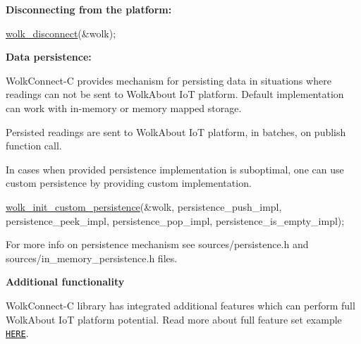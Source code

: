 {\bfseries Disconnecting from the platform\+:} 
\begin{DoxyCode}
\hyperlink{wolk__connector_8h_af174943365b8cddc1e6e9351996805c3}{wolk\_disconnect}(&wolk);
\end{DoxyCode}


{\bfseries Data persistence\+:}

Wolk\+Connect-\/C provides mechanism for persisting data in situations where readings can not be sent to Wolk\+About IoT platform. Default implementation can work with in-\/memory or memory mapped storage.

Persisted readings are sent to Wolk\+About IoT platform, in batches, on publish function call.

In cases when provided persistence implementation is suboptimal, one can use custom persistence by providing custom implementation.


\begin{DoxyCode}
\hyperlink{wolk__connector_8h_a4cb5cc0164b0ab19f9b2bf36d28e9913}{wolk\_init\_custom\_persistence}(&wolk,
                             persistence\_push\_impl,
                             persistence\_peek\_impl, persistence\_pop\_impl,
                             persistence\_is\_empty\_impl);
\end{DoxyCode}


For more info on persistence mechanism see {\ttfamily sources/persistence.\+h} and {\ttfamily sources/in\+\_\+memory\+\_\+persistence.\+h} files.

{\bfseries Additional functionality}

Wolk\+Connect-\/C library has integrated additional features which can perform full Wolk\+About IoT platform potential. Read more about full feature set example \href{https://github.com/Wolkabout/WolkConnect-C/tree/master/examples/full_feature_set}{\tt H\+E\+RE}. 